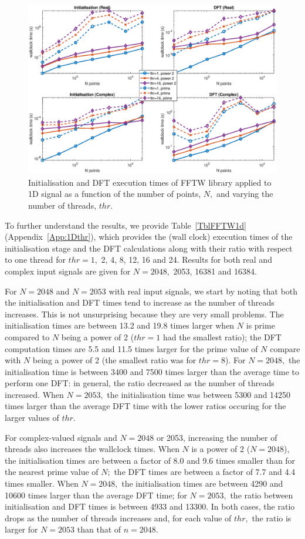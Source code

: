 \documentclass[a4paper]{article}
\begin{document}
\begin{figure}[!htb]
    \centering
    \includegraphics[width=0.9\linewidth]{../results/fftw_1d_thr.eps}
  \caption{Initialisation and DFT execution times of FFTW library applied to 1D signal as a function of the
    number of points, $N,$ and varying the number of threads, $thr.$ }
  \label{fig1DFFTW}
\end{figure}

To further understand the results, we provide Table~\ref{TblFFTW1d}
(Appendix~\ref{App:1Dthr}), which provides the (wall clock) execution
times of the initialisation stage and the DFT calculations along with
their ratio with respect to one thread for $thr=1,$ 2, 4, 8, 12, 16
and 24. Results for both real and complex input signals are given for
$N=2048,$ 2053, 16381 and 16384.

For $N=2048$ and $N=2053$ with real input signals, we start by
noting that both the initialisation and DFT times tend to increase as
the number of threads increases. This is not unsurprising because they
are very small problems. The
initialisation times are between 13.2 and 19.8 times larger when $N$
is prime compared to $N$ being a power of 2 ($thr=1$ had the smallest
ratio); the DFT computation times are 5.5 and 11.5 times larger for
the prime value of $N$ compare with $N$ being a power of 2 (the
smallest ratio was for $thr=8$). For $N=2048,$ the initialisation time
is between 3400 and 7500 times larger than the average time to perform
one DFT: in general, the ratio decreased as the number of threads
increased. When $N=2053,$ the initialisation time was between 5300 and
14250 times larger than the average DFT time with the lower ratios
occuring for the larger values of $thr.$

For complex-valued signals and $N=2048$ or 2053, increasing the number
of threads also increases the wallclock times. When $N$ is a power of
2 ($N=2048$), the initialisation times are between a factor of 8.0 and
9.6 times smaller than for the nearest prime value of $N;$ the DFT
times are between a factor of 7.7 and 4.4 times smaller. When
$N=2048,$ the initialisation times are between 4290 and 10600 times
larger than the average DFT time; for $N=2053,$ the ratio between
initialisation and DFT times is between 4933 and 13300. In both cases,
the ratio drops as the number of threads increases and, for each value
of $thr,$ the ratio is larger for $N=2053$ than that of $n=2048.$
\end{document}
